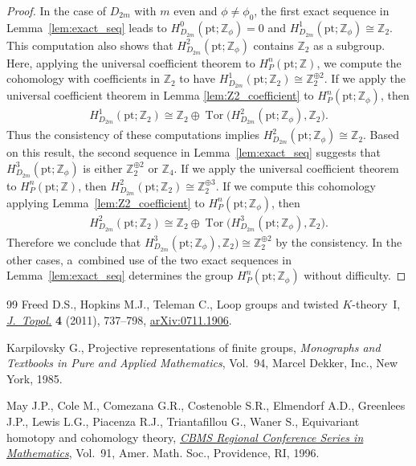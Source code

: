 \documentclass[11pt]{article}
\theoremstyle{definition}
\newcommand{\Z}{\mathbb{Z}}
\newcommand{\pt}{\mathrm{pt}}
\begin{document}
\begin{proof}
In the case of $D_{2m}$ with $m$ even and $\phi \neq \phi_0$, the f\/irst exact sequence in Lemma~\ref{lem:exact_seq} leads to $H^0_{D_{2m}}(\pt; \Z_\phi) = 0$ and $H^1_{D_{2m}}(\pt; \Z_\phi) \cong \Z_2$. This computation also shows that $H^2_{D_{2m}}(\pt; \Z_\phi)$ contains $\Z_2$ as a subgroup. Here, applying the universal coef\/f\/icient theorem to $H^n_P(\pt; \Z)$, we compute the cohomology with coef\/f\/icients in $\Z_2$ to have $H^1_{D_{2m}}(\pt; \Z_2) \cong \Z_2^{\oplus 2}$. If we apply the universal coef\/f\/icient theorem in Lemma \ref{lem:Z2_coefficient} to $H^n_P(\pt; \Z_\phi)$, then
\begin{gather*}
H^1_{D_{2m}}(\pt; \Z_2) \cong \Z_2 \oplus \operatorname{Tor}\big(H^2_{D_{2m}}(\pt; \Z_\phi), \Z_2\big).
\end{gather*}
Thus the consistency of these computations implies $H^2_{D_{2m}}(\pt; \Z_\phi) \cong \Z_2$. Based on this result, the second sequence in Lemma~\ref{lem:exact_seq} suggests that $H^3_{D_{2m}}(\pt; \Z_\phi)$ is either $\Z_2^{\oplus 2}$ or $\Z_4$. If we apply the universal coef\/f\/icient theorem to $H^n_P(\pt; \Z)$, then $H^2_{D_{2m}}(\pt; \Z_2) \cong \Z_2^{\oplus 3}$. If we compute this cohomology applying Lemma~\ref{lem:Z2_coefficient} to $H^n_P(\pt; \Z_\phi)$, then
\begin{gather*}
H^2_{D_{2m}}(\pt; \Z_2) \cong \Z_2 \oplus \operatorname{Tor}\big(H^3_{D_{2m}}(\pt; \Z_\phi), \Z_2\big).
\end{gather*}
Therefore we conclude that $H^3_{D_{2m}}(\pt; \Z_\phi), \Z_2) \cong \Z_2^{\oplus 2}$ by the consistency. In the other cases, a~combined use of the two exact sequences in Lemma~\ref{lem:exact_seq} determines the group $H^n_P(\pt; \Z_\phi)$ without dif\/f\/iculty.
\end{proof}
\begin{thebibliography}{99}
Freed D.S., Hopkins M.J., Teleman C., Loop groups and twisted {$K$}-theory~{I},
 \href{https://doi.org/10.1112/jtopol/jtr019}{\textit{J.~Topol.}} \textbf{4} (2011), 737--798, \href{http://arxiv.org/abs/0711.1906}{arXiv:0711.1906}.

Karpilovsky G., Projective representations of f\/inite groups, \textit{Monographs
 and Textbooks in Pure and Applied Mathematics}, Vol.~94, Marcel Dekker, Inc.,
 New York, 1985.

May J.P., Cole M., Comezana G.R., Costenoble S.R., Elmendorf A.D., Greenlees
 J.P., Lewis L.G., Piacenza R.J., Triantaf\/illou G., Waner S., Equivariant
 homotopy and cohomology theory, \href{https://doi.org/10.1090/cbms/091}{\textit{CBMS Regional Conference Series in
 Mathematics}}, Vol.~91, Amer. Math. Soc., Providence, RI, 1996.

\end{thebibliography}
\end{document}
